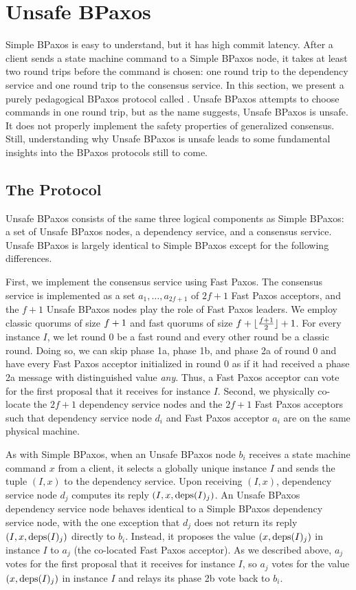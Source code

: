 \section{Unsafe BPaxos}
Simple BPaxos is easy to understand, but it has high commit latency. After a
client sends a state machine command to a Simple BPaxos node, it takes at least
two round trips before the command is chosen: one round trip to the dependency
service and one round trip to the consensus service. In this section, we
present a purely pedagogical BPaxos protocol called .
Unsafe BPaxos attempts to choose commands in one round trip, but as the name
suggests, Unsafe BPaxos is unsafe. It does not properly implement the safety
properties of generalized consensus. Still, understanding why Unsafe BPaxos is
unsafe leads to some fundamental insights into the BPaxos protocols still to
come.

\subsection{The Protocol}
Unsafe BPaxos consists of the same three logical components as Simple
BPaxos: a set of Unsafe BPaxos nodes, a dependency service, and a consensus
service. Unsafe BPaxos is largely identical to Simple BPaxos except for the
following differences.

First, we implement the consensus service using Fast Paxos. The consensus
service is implemented as a set $a_1, \ldots, a_{2f + 1}$ of $2f + 1$ Fast
Paxos acceptors, and the $f + 1$ Unsafe BPaxos nodes play the role of Fast
Paxos leaders. We employ classic quorums of size $f + 1$ and fast quorums
of size $f + \lfloor\frac{f + 1}{2}\rfloor + 1$. For every instance $I$, we let round $0$ be a fast
round and every other round be a classic round. Doing so, we can skip phase 1a,
phase 1b, and phase 2a of round $0$ and have every Fast Paxos acceptor
initialized in round $0$ as if it had received a phase 2a message with
distinguished value \emph{any}. Thus, a Fast Paxos acceptor can vote for the
first proposal that it receives for instance $I$.
%
Second, we physically co-locate the $2f + 1$ dependency service nodes and the
$2f + 1$ Fast Paxos acceptors such that dependency service node $d_i$ and Fast
Paxos acceptor $a_i$ are on the same physical machine.

As with Simple BPaxos, when an Unsafe BPaxos node $b_i$ receives a state
machine command $x$ from a client, it selects a globally unique instance $I$
and sends the tuple $(I, x)$ to the dependency service. Upon receiving $(I,
x)$, dependency service node $d_j$ computes its reply $(I, x, \text{deps}(I)_j)$.  An
Unsafe BPaxos dependency service node behaves identical to a Simple BPaxos
dependency service node, with the one exception that $d_j$ does not return its
reply $(I, x, \text{deps}(I)_j)$ directly to $b_i$. Instead, it proposes the value
$(x, \text{deps}(I)_j)$ in instance $I$ to $a_j$ (the co-located Fast Paxos
acceptor). As we described above, $a_j$ votes for the first proposal that it
receives for instance $I$, so $a_j$ votes for the value $(x, \text{deps}(I)_j)$ in
instance $I$ and relays its phase 2b vote back to $b_i$.

